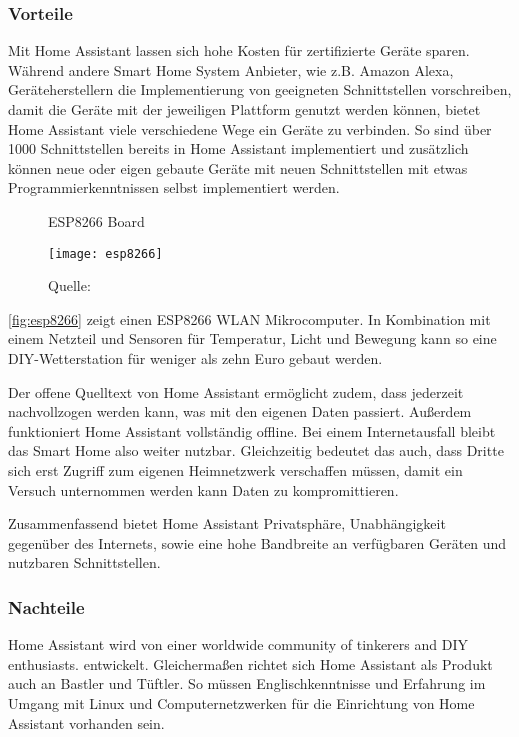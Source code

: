\subsubsection{Vorteile}

Mit Home Assistant lassen sich hohe Kosten für zertifizierte Geräte sparen.
Während andere Smart Home System Anbieter, wie z.B. Amazon Alexa, Geräteherstellern die Implementierung von geeigneten Schnittstellen vorschreiben, damit die Geräte mit der jeweiligen Plattform genutzt werden können, bietet Home Assistant viele verschiedene Wege ein Geräte zu verbinden.
So sind über 1000 Schnittstellen bereits in Home Assistant implementiert und zusätzlich können neue oder eigen gebaute Geräte mit neuen Schnittstellen mit etwas Programmierkenntnissen selbst implementiert werden.

\begin{wrapfigure}{r}{0.4\textwidth}
	\centering
	\caption{ESP8266 Board}
	\texttt{[image: esp8266]}
	\caption*{\footnotesize{Quelle: }}
	\label{fig:esp8266}
\end{wrapfigure}

\autoref{fig:esp8266} zeigt einen ESP8266 WLAN Mikrocomputer.
In Kombination mit einem Netzteil und Sensoren für Temperatur, Licht und Bewegung kann so eine \ac{DIY}-Wetterstation für weniger als zehn Euro gebaut werden.

Der offene Quelltext von Home Assistant ermöglicht zudem, dass jederzeit nachvollzogen werden kann, was mit den eigenen Daten passiert.
Außerdem funktioniert Home Assistant vollständig offline.
Bei einem Internetausfall bleibt das Smart Home also weiter nutzbar.
Gleichzeitig bedeutet das auch, dass Dritte sich erst Zugriff zum eigenen Heimnetzwerk verschaffen müssen, damit ein Versuch unternommen werden kann Daten zu kompromittieren.

Zusammenfassend bietet Home Assistant Privatsphäre, Unabhängigkeit gegenüber des Internets, sowie eine hohe Bandbreite an verfügbaren Geräten und nutzbaren Schnittstellen.

\subsubsection{Nachteile}

Home Assistant wird von einer \glqq worldwide community of tinkerers and DIY enthusiasts.\grqq{} entwickelt.
Gleichermaßen richtet sich Home Assistant als Produkt auch an Bastler und Tüftler.
So müssen Englischkenntnisse und Erfahrung im Umgang mit Linux und Computernetzwerken für die Einrichtung von Home Assistant vorhanden sein.

